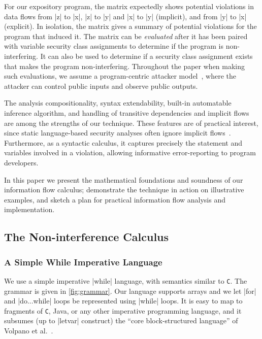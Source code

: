 For our expository program, the matrix expectedly shows potential violations in data flows from
\prc|z| to \prc|x|, \prc|z| to \prc|y| and \prc|x| to \prc|y| (implicit), and from \prc|y| to \prc|x| (explicit).
In isolation, the matrix gives a summary of potential violations for the program that induced it.
The matrix can be \emph{evaluated} after it has been paired with variable security class assignments to determine if the program is non-interfering.
It can also be used to determine if a security class assignment exists that makes the program non-interfering.
Throughout the paper when making such evaluations, we assume a program-centric attacker model~\cite{hedin2012}, where the attacker can control public inputs and observe public outputs.

The analysis compositionality, syntax extendability, built-in automatable inference algorithm, and handling of transitive dependencies and implicit flows are among the strengths of our technique.
These features are of practical interest, since static language-based security analyses often ignore implicit flows~\cite[pg.~144]{huang2014}.
Furthermore, as a syntactic calculus, it captures precisely the statement and variables involved in a violation, allowing informative error-reporting to program developers.

In this paper
we present the mathematical foundations and soundness of our information flow calculus;
demonstrate the technique in action on illustrative examples,
and sketch a plan for practical information flow analysis and implementation.

\subsection{The Non-interference Calculus}
\label{plas-calculus}

\subsubsection{A Simple While Imperative Language}
\label{subsec:language}

We use a simple imperative \textnormal{\prc|while|} language, with semantics similar to \texttt{C}.
The grammar is given in \autoref{fig:grammar}.
Our language supports arrays %
and we let \prc|for| and \prc|do...while| loops be represented using \prc|while| loops.
It is easy to map to fragments of \texttt{C}, Java, or any other imperative programming language, and it subsumes (up to \prc|letvar| construct) the \enquote{core block-structured language} of Volpano et al.~\cite{VolpanoI1996}.


